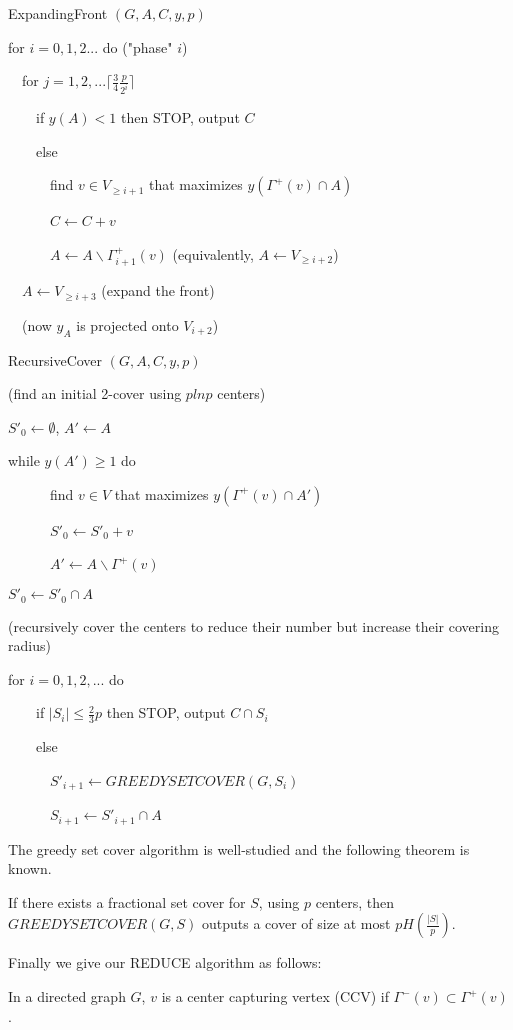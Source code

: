 \begin{algorithm}
\caption{ExpandingFront $(G,A,C,y,p)$}
for $i=0,1,2...$ do ("phase" $i$)

\ \ for $j=1,2,...\lceil \frac{3}{4}\frac{p}{2^i} \rceil$

\ \ \ \ if $y(A) < 1$ then STOP, output $C$

\ \ \ \ else

\ \ \ \ \ \ find $v \in V_{\geq i+1}$ that maximizes $y(\Gamma^+(v)\cap A)$

\ \ \ \ \ \ $C\leftarrow C+v$

\ \ \ \ \ \ $A\leftarrow A \backslash \Gamma^+_{i+1}(v) $ (equivalently, $A\leftarrow V_{\geq i+2}$)

\ \ $A\leftarrow V_{\geq i+3}$ (expand the front)

\ \ (now $y_A$ is projected onto $V_{i+2}$)
\end{algorithm}


\begin{algorithm}
\caption{RecursiveCover $(G,A,C,y,p)$}
(find an initial 2-cover using $plnp$ centers)

$S'_0 \leftarrow \emptyset$, $A' \leftarrow A$

while $y(A') \geq 1$ do

\ \ \ \ \ \ find $v \in V$ that maximizes $y(\Gamma^+(v)\cap A')$

\ \ \ \ \ \ $S'_0 \leftarrow S'_0+v$

\ \ \ \ \ \ $A'\leftarrow A \backslash \Gamma^+(v) $ 

$S'_0 \leftarrow S'_0 \cap A$ 

(recursively cover the centers to reduce their number but increase their covering radius)

for $i= 0,1,2,...$ do 

\ \ \ \ if $\vert S_i \vert \leq \frac{2}{3}p$ then STOP, output $C \cap S_i$

\ \ \ \ else

\ \ \ \ \ \ $S'_{i+1} \leftarrow GREEDYSETCOVER(G, S_i)$

\ \ \ \ \ \ $S_{i+1}\leftarrow S'_{i+1} \cap A$
\end{algorithm}

The greedy set cover algorithm is well-studied and the following theorem is known.
\begin{theorem}
If there exists a fractional set cover for $S$, using $p$ centers, then $GREEDYSETCOVER(G,S)$ outputs a cover of size at most $pH(\frac{\vert S \vert}{p})$. 
\end{theorem}
Finally we give our REDUCE algorithm as follows:\\
\begin{definition}
In a directed graph $G$, $v$ is a center capturing vertex (CCV) if $\Gamma^-(v) \subset \Gamma^+(v)$.
\end{definition}

